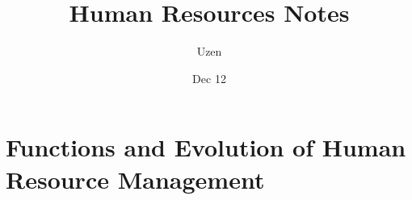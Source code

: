 \documentclass{report}
\title{Human Resources Notes}
\author{Uzen}
\date{Dec 12}
\begin{document}
\maketitle
\newpage
\tableofcontents
\newpage

\chapter{Functions and Evolution of Human Resource Management}

\end{document}
